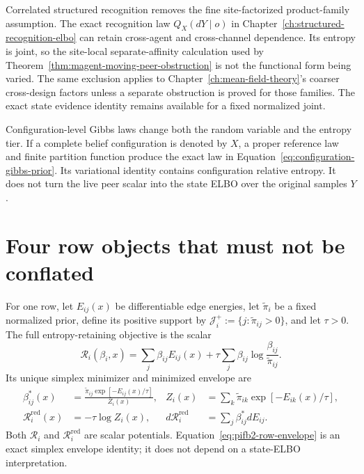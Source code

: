 Correlated structured recognition removes the fine site-factorized product-family assumption. The exact recognition law \(Q_X(dY\mid o)\) in Chapter~\ref{ch:structured-recognition-elbo} can retain cross-agent and cross-channel dependence. Its entropy is joint, so the site-local separate-affinity calculation used by Theorem~\ref{thm:magent-moving-peer-obstruction} is not the functional form being varied. The same exclusion applies to Chapter~\ref{ch:mean-field-theory}'s coarser cross-design factors unless a separate obstruction is proved for those families. The exact state evidence identity remains available for a fixed normalized joint.

Configuration-level Gibbs laws change both the random variable and the entropy tier. If a complete belief configuration is denoted by \(X\), a proper reference law and finite partition function produce the exact law in Equation~\eqref{eq:configuration-gibbs-prior}. Its variational identity contains configuration relative entropy. It does not turn the live peer scalar into the state ELBO over the original samples \(Y\).

\section{Four row objects that must not be conflated}

For one row, let \(E_{ij}(x)\) be differentiable edge energies, let \(\widetilde\pi_i\) be a fixed normalized prior, define its positive support by \(\mathcal J_i^+:=\{j:\widetilde\pi_{ij}>0\}\), and let \(\tau>0\). The full entropy-retaining objective is the scalar
\begin{equation}
\mathcal R_i(\beta_i,x)
=\sum_j\beta_{ij}E_{ij}(x)
+\tau\sum_j\beta_{ij}\log\frac{\beta_{ij}}{\widetilde\pi_{ij}}.
\label{eq:pifb2-full-row-scalar}
\end{equation}
Its unique simplex minimizer and minimized envelope are
\begin{align}
\beta_{ij}^*(x)
&=\frac{\widetilde\pi_{ij}\exp[-E_{ij}(x)/\tau]}
{Z_i(x)},
&
Z_i(x)
&=\sum_k\widetilde\pi_{ik}\exp[-E_{ik}(x)/\tau],
\label{eq:pifb2-row-optimum}\\
\mathcal R_i^{\mathrm{red}}(x)
&=-\tau\log Z_i(x),
&
d\mathcal R_i^{\mathrm{red}}
&=\sum_j\beta_{ij}^*dE_{ij}.
\label{eq:pifb2-row-envelope}
\end{align}
Both \(\mathcal R_i\) and \(\mathcal R_i^{\mathrm{red}}\) are scalar potentials. Equation~\eqref{eq:pifb2-row-envelope} is an exact simplex envelope identity; it does not depend on a state-ELBO interpretation.

